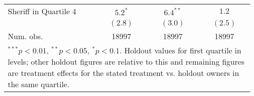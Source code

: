 \begin{table}[htb]
\begin{center}
\begin{tabular}{l c c c }
Sheriff in Quartile 4 & $5.2^{*}$     & $6.4^{**}$    & $1.2$        \\
                      & $(2.8)$       & $(3.0)$       & $(2.5)$      \\
\hline
Num. obs.             & 18997         & 18997         & 18997        \\
\hline
\multicolumn{4}{l}{\scriptsize{\parbox{.75\linewidth}{$^{***}p<0.01$, $^{**}p<0.05$, $^*p<0.1$. Holdout values for first quartile in levels; other holdout figures are relative to this and remaining figures are treatment effects for the stated treatment vs. holdout owners in the same quartile.}}}
\end{tabular}
\label{tbl:lpm_hetero}
\end{center}
\end{table}
